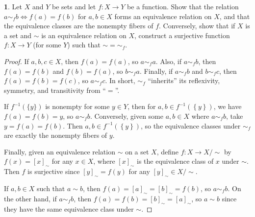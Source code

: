 \documentclass[12pt]{article}
\theoremstyle{definition}
\newtheorem{ex}{}
\begin{document}
\begin{ex}
	Let $X$ and $Y$ be sets and let $f : X \to Y$ be a function.
	Show that the relation $a \sim_f b \iff f(a) = f(b)$ for $a, b \in X$ forms an equivalence relation on $X$, and that the equivalence classes are the nonempty fibers of $f$.
	Conversely, show that if $X$ is a set and $\sim$ is an equivalence relation on $X$, construct a surjective function $f : X \to Y$ (for some $Y$) such that $\sim = \sim_f$.
\end{ex}
\begin{proof}
	If $a, b, c \in X$, then $f(a) = f(a)$, so $a \sim_f a$.
	Also, if $a \sim_f b$, then $f(a) = f(b)$ and $f(b) = f(a)$, so $b \sim_f a$.
	Finally, if $a \sim_f b$ and $b \sim_f c$, then $f(a) = f(b) = f(c)$, so $a \sim_f c$.
	In short, $\sim_f$ ``inherits'' its reflexivity, symmetry, and transitivity from ``$=$''.

	If $f^{-1}(\lbrace y \rbrace)$ is nonempty for some $y \in Y$, then for $a, b \in f^{-1}(\left\lbrace y \right\rbrace)$, we have $f(a) = f(b) = y$, so $a \sim_f b$.
	Conversely, given some $a, b \in X$ where $a \sim_f b$, take $y = f(a) = f(b)$.
	Then $a, b \in f^{-1}(\left\lbrace y \right\rbrace)$, so the equivalence classes under $\sim_f$ are exactly the nonempty fibers of $y$.

	Finally, given an equivalence relation $\sim$ on a set $X$, define $f: X \to X/\sim$ by $f(x) = [x]_\sim$ for any $x \in X$, where $[x]_\sim$ is the equivalence class of $x$ under $\sim$.
	Then $f$ is surjective since $[y]_\sim = f(y)$ for any $[y]_\sim \in X/\sim$.

	If $a, b \in X$ such that $a \sim b$, then $f(a) = [a]_\sim = [b]_\sim = f(b)$, so $a \sim_f b$.
	On the other hand, if $a \sim_f b$, then $f(a) = f(b) = [b]_\sim = [a]_\sim$, so $a \sim b$ since they have the same equivalence class under $\sim$.
\end{proof}
\end{document}
